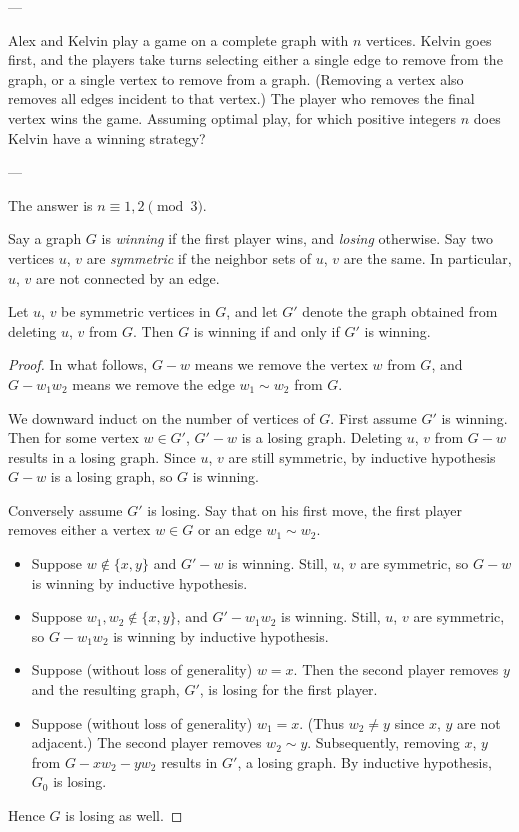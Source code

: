 
---

Alex and Kelvin play a game on a complete graph with $n$ vertices. Kelvin goes first, and the players take turns selecting either a single edge to remove from the graph, or a single vertex to remove from a graph. (Removing a vertex also removes all edges incident to that vertex.) The player who removes the final vertex wins the game. Assuming optimal play, for which positive integers $n$ does Kelvin have a winning strategy?

---

The answer is $n\equiv1,2\pmod3$.

Say a graph $G$ is \emph{winning} if the first player wins, and \emph{losing} otherwise. Say two vertices $u$, $v$ are \emph{symmetric} if the neighbor sets of $u$, $v$ are the same. In particular, $u$, $v$ are not connected by an edge.
\begin{lemma*}
    Let $u$, $v$ be symmetric vertices in $G$, and let $G'$ denote the graph obtained from deleting $u$, $v$ from $G$. Then $G$ is winning if and only if $G'$ is winning.
\end{lemma*}
\begin{proof}
    In what follows, $G-w$ means we remove the vertex $w$ from $G$, and $G-w_1w_2$ means we remove the edge $w_1\sim w_2$ from $G$.

    We downward induct on the number of vertices of $G$. First assume $G'$ is winning. Then for some vertex $w\in G'$, $G'-w$ is a losing graph. Deleting $u$, $v$ from $G-w$ results in a losing graph. Since $u$, $v$ are still symmetric, by inductive hypothesis $G-w$ is a losing graph, so $G$ is winning.

    Conversely assume $G'$ is losing. Say that on his first move, the first player removes either a vertex $w\in G$ or an edge $w_1\sim w_2$.
    \begin{itemize}
        \item Suppose $w\notin\{x,y\}$ and $G'-w$ is winning. Still, $u$, $v$ are symmetric, so $G-w$ is winning by inductive hypothesis.
        \item Suppose $w_1,w_2\notin\{x,y\}$, and $G'-w_1w_2$ is winning. Still, $u$, $v$ are symmetric, so $G-w_1w_2$ is winning by inductive hypothesis.
        \item Suppose (without loss of generality) $w=x$. Then the second player removes $y$ and the resulting graph, $G'$, is losing for the first player.
        \item Suppose (without loss of generality) $w_1=x$. (Thus $w_2\ne y$ since $x$, $y$ are not adjacent.) The second player removes $w_2\sim y$. Subsequently, removing $x$, $y$ from $G-xw_2-yw_2$ results in $G'$, a losing graph. By inductive hypothesis, $G_0$ is losing.
    \end{itemize}
    Hence $G$ is losing as well.
\end{proof}

